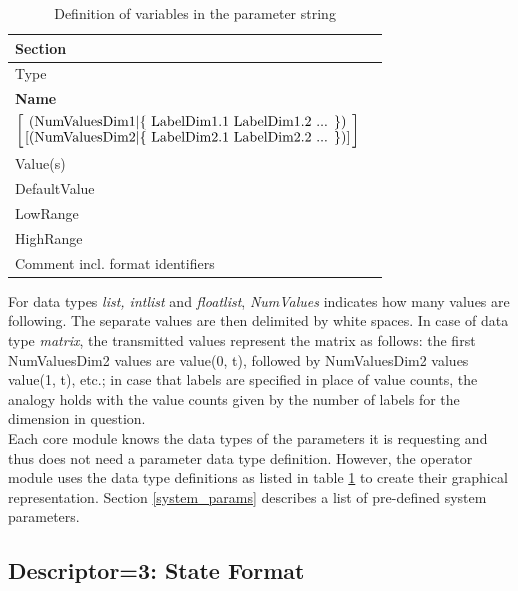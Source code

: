 \documentclass[letterpaper,oneside,12pt]{book}
\newcommand{\todo}[1]{}
\begin{document}
\begin{table}[ht]
 \centering
 \begin{tabular}{|l|l|}
  \hline
  Section \\
  \hline
  Type \\
  \hline
  \textbf{Name} \\
  \hline
  ${\left[
    \mbox{(NumValuesDim1$\mid$\{ LabelDim1.1 LabelDim1.2 ... \})}
    \atop
    \mbox{[(NumValuesDim2$\mid$\{ LabelDim2.1 LabelDim2.2 ... \})]}
    \right]}$ \\
  \hline
  Value(s) \\
  \hline
  DefaultValue \\
  \hline
  LowRange \\
  \hline
  HighRange \\
  \hline
  Comment incl. format identifiers \\
  \hline
 \end{tabular}
 \caption{Definition of variables in the parameter string}
 \label{tab:parametervariables}
\end{table}   

For data types \textit{list, intlist} and \textit{floatlist}, \textit{NumValues} 
indicates how many values are following. The separate values are then 
delimited by white spaces. In case of data type \textit{matrix}, the transmitted 
values represent the matrix as follows: the first NumValuesDim2 values are 
value(0, t), followed by NumValuesDim2 values value(1, t), etc.; in case that 
labels are specified in place of value counts, the analogy holds with the value 
counts given by the number of labels for the dimension in question.\\

Each core module knows the data types of the parameters it is requesting and 
thus does not need a parameter data type definition. However, the operator 
module uses the data type definitions as listed in table 
\ref{tab:parametervariables} to create their graphical representation. Section 
\ref{system_params} describes a list of pre-defined system parameters.

\todo{Describe proposal for parameter data type for state definition, e.g.,
TargetCode 1 Feedback 1}

\subsection{Descriptor=3: State Format}
\label{state_format}
\end{document}
